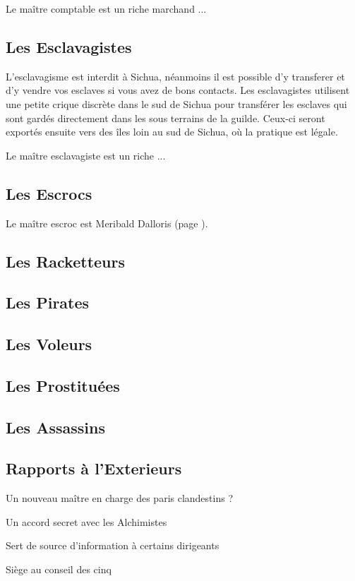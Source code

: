 Le maître comptable est un riche marchand ...

\subsection{Les Esclavagistes}

L'esclavagisme est interdit à Sichua, néanmoins il est possible d'y transferer
et d'y vendre vos esclaves si vous avez de bons contacts. Les esclavagistes 
utilisent une petite crique discrète dans le sud de Sichua pour transférer
les esclaves qui sont gardés directement dans les sous terrains de la guilde.
Ceux-ci seront exportés ensuite vers des îles loin au sud de Sichua, où la
pratique est légale. 

Le maître esclavagiste est un riche ...

\subsection{Les Escrocs}


Le maître escroc est Meribald Dalloris (page \pageref{MeribaldDalloris}).

\subsection{Les Racketteurs}


\subsection{Les Pirates}


\subsection{Les Voleurs}


\subsection{Les Prostituées}


\subsection{Les Assassins}


\subsection{Rapports à l'Exterieurs}

Un nouveau maître en charge des paris clandestins ?

Un accord secret avec les Alchimistes

Sert de source d'information à certains dirigeants

Siège au conseil des cinq
